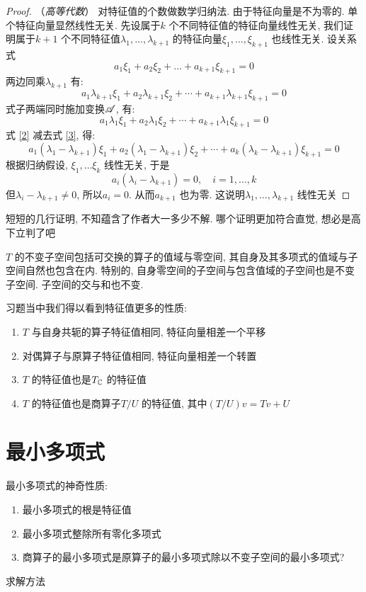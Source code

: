 \begin{proof}
    （\textit{高等代数}）
    对特征值的个数做数学归纳法. 由于特征向量是不为零的. 单个特征向量显然线性无关. 先设属于\(k\)
    个不同特征值的特征向量线性无关, 我们证明属于\(k+1\) 个不同特征值\(\lambda_1,\dots
    ,\lambda_{k+1}\) 的特征向量\(\xi_1,\dots ,\xi_{k+1}\) 也线性无关.
    设关系式
    \begin{equation}
        a_1\xi_1 + a_2\xi_2 + \dots + a_{k+1}\xi_{k+1} = 0 \label{1}
    \end{equation}
    两边同乘\(\lambda_{k+1}\) 有:
    \begin{equation}
        a_1\lambda_{k+1}\xi_1 + a_2\lambda_{k+1}\xi_2 +
        \cdots + a_{k+1}\lambda_{k+1}\xi_{k+1} = 0 \label{2}
    \end{equation}
    式子两端同时施加变换\(\mathscr{A}\), 有:
    \begin{equation}
        a_1\lambda_1\xi_1 + a_2\lambda_1\xi_2 + \cdots +
        a_{k+1}\lambda_1\xi_{k+1} = 0 \label{3}
    \end{equation}
    式 \eqref{2} 减去式 \eqref{3}, 得:
    \[
        a_1(\lambda_1 - \lambda_{k+1})\xi_1 + a_2(\lambda_1
        - \lambda_{k+1})\xi_2 + \cdots +
        a_{k}(\lambda_{k} - \lambda_{k+1})\xi_{k+1} = 0
    \]
    根据归纳假设, \(\xi_1,\dots \xi_{k}\) 线性无关, 于是
    \[
        a_{i}(\lambda_{i} - \lambda_{k+1}) = 0, \quad i=1,\dots ,k
    \]
    但\(\lambda_{i}-\lambda_{k+1}\neq 0\), 所以\(a_{i}=0\).
    从而\(a_{k+1}\) 也为零. 这说明\(\lambda_1,\dots ,\lambda_{k+1}\) 线性无关
\end{proof}

短短的几行证明, 不知蕴含了作者大一多少不解. 哪个证明更加符合直觉,
想必是高下立判了吧

\(T\) 的不变子空间包括可交换的算子的值域与零空间, 其自身及其多项式的值域与子空间自然也包含在内.
特别的, 自身零空间的子空间与包含值域的子空间也是不变子空间. 子空间的交与和也不变.

习题当中我们得以看到特征值更多的性质:
\begin{enumerate}
    \item \(T\) 与自身共轭的算子特征值相同, 特征向量相差一个平移
    \item 对偶算子与原算子特征值相同, 特征向量相差一个转置
    \item \(T\) 的特征值也是\(T_{\mathbb{C}}\) 的特征值
    \item \(T\) 的特征值也是商算子\(T/U\) 的特征值, 其中\((T/U)v=Tv+U\)
\end{enumerate}

\section{最小多项式}


最小多项式的神奇性质:
\begin{enumerate}
    \item 最小多项式的根是特征值
    \item 最小多项式整除所有零化多项式
    \item 商算子的最小多项式是原算子的最小多项式除以不变子空间的最小多项式?
\end{enumerate}
求解方法

